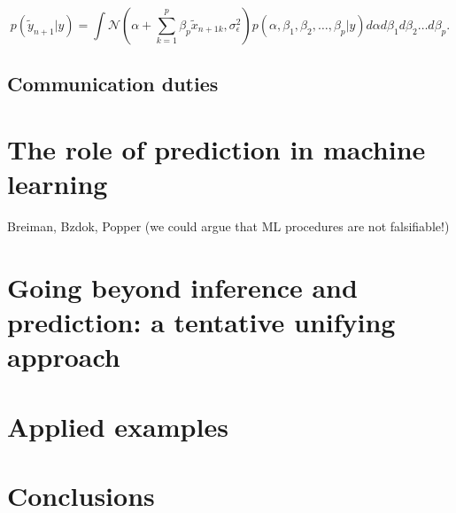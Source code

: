 \documentclass{statsoc}
\begin{document}
$$ p(\tilde{y}_{n+1}|y)= \int \mathcal{N}(\alpha+\sum_{k=1}^{p}\beta_p \tilde{x}_{n+1k}, \sigma^2_{\epsilon}) p(\alpha, \beta_1, \beta_2,\ldots,\beta_p|y) d\alpha  d\beta_1 d\beta_2\ldots d\beta_p.$$


\subsection{Communication duties}


\section{The role of prediction in machine learning}

\color{blue}

Breiman, Bzdok, Popper (we could argue that ML procedures are not falsifiable!)

\color{black}

\section{Going beyond inference and prediction: a tentative unifying approach}

\section{Applied examples}

\section{Conclusions}







\end{document}
